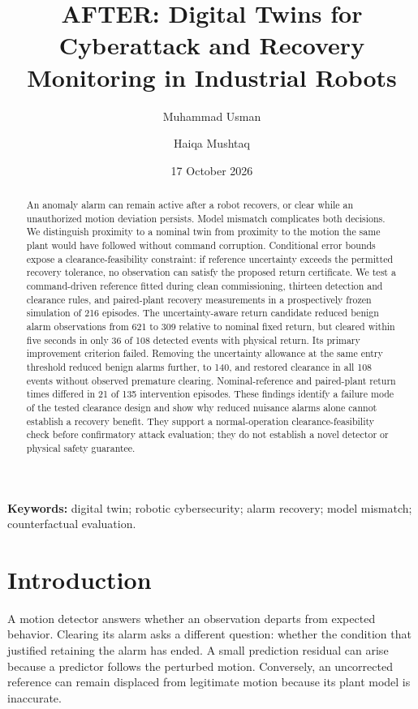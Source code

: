 \documentclass[11pt]{article}
\title{AFTER: Digital Twins for Cyberattack and Recovery Monitoring in Industrial Robots}
\author{Muhammad Usman \and Haiqa Mushtaq}
\date{17 October 2026}
\begin{document}
\maketitle
\begin{abstract}
An anomaly alarm can remain active after a robot recovers, or clear while an unauthorized motion deviation persists. Model mismatch complicates both decisions. We distinguish proximity to a nominal twin from proximity to the motion the same plant would have followed without command corruption. Conditional error bounds expose a clearance-feasibility constraint: if reference uncertainty exceeds the permitted recovery tolerance, no observation can satisfy the proposed return certificate. We test a command-driven reference fitted during clean commissioning, thirteen detection and clearance rules, and paired-plant recovery measurements in a prospectively frozen simulation of 216 episodes. The uncertainty-aware return candidate reduced benign alarm observations from 621 to 309 relative to nominal fixed return, but cleared within five seconds in only 36 of 108 detected events with physical return. Its primary improvement criterion failed. Removing the uncertainty allowance at the same entry threshold reduced benign alarms further, to 140, and restored clearance in all 108 events without observed premature clearing. Nominal-reference and paired-plant return times differed in 21 of 135 intervention episodes. These findings identify a failure mode of the tested clearance design and show why reduced nuisance alarms alone cannot establish a recovery benefit. They support a normal-operation clearance-feasibility check before confirmatory attack evaluation; they do not establish a novel detector or physical safety guarantee.
\end{abstract}
\noindent\textbf{Keywords:} digital twin; robotic cybersecurity; alarm recovery; model mismatch; counterfactual evaluation.

\section{Introduction}
A motion detector answers whether an observation departs from expected behavior. Clearing its alarm asks a different question: whether the condition that justified retaining the alarm has ended. A small prediction residual can arise because a predictor follows the perturbed motion. Conversely, an uncorrected reference can remain displaced from legitimate motion because its plant model is inaccurate.
\end{document}
